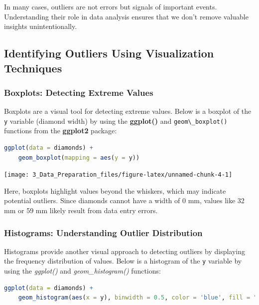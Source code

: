 \documentclass[
  11pt,
]{book}
\newcommand{\passthrough}[1]{#1}
\theoremstyle{definition}
\theoremstyle{definition}
\theoremstyle{definition}
\theoremstyle{definition}
\theoremstyle{remark}
\begin{document}
In many cases, outliers are not errors but signals of important events. Understanding their role in data analysis ensures that we don't remove valuable insights unintentionally.

\subsection*{Identifying Outliers Using Visualization Techniques}\label{identifying-outliers-using-visualization-techniques}


\subsubsection*{Boxplots: Detecting Extreme Values}\label{boxplots-detecting-extreme-values}


Boxplots are a visual tool for detecting extreme values. Below is a boxplot of the \passthrough{\lstinline!y!} variable (diamond width) by using the \textbf{ggplot()} and \passthrough{\lstinline!geom\_boxplot()!} functions from the \textbf{ggplot2} package:

\begin{lstlisting}[language=R]
ggplot(data = diamonds) +
    geom_boxplot(mapping = aes(y = y))
\end{lstlisting}

\begin{center}\texttt{[image: 3\_Data\_Preparation\_files/figure-latex/unnamed-chunk-4-1]} \end{center}

Here, boxplots highlight values beyond the whiskers, which may indicate potential outliers. Since diamonds cannot have a width of 0 mm, values like 32 mm or 59 mm likely result from data entry errors.

\subsubsection*{Histograms: Understanding Outlier Distribution}\label{histograms-understanding-outlier-distribution}


Histograms provide another visual approach to detecting outliers by displaying the frequency distribution of values. Below is a histogram of the \passthrough{\lstinline!y!} variable by using the \emph{ggplot()} and \emph{geom\_histogram()} functions:

\begin{lstlisting}[language=R]
ggplot(data = diamonds) +
    geom_histogram(aes(x = y), binwidth = 0.5, color = 'blue', fill = "lightblue")
\end{lstlisting}
\end{document}
